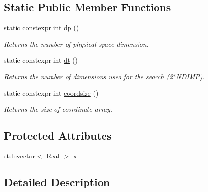 \subsection*{Static Public Member Functions}
\begin{DoxyCompactItemize}
\item 
\hypertarget{classBox_ac6c8af90475ae92c884f1ad4c569749f}{
static constexpr int \hyperlink{classBox_ac6c8af90475ae92c884f1ad4c569749f}{dp} ()}
\label{classBox_ac6c8af90475ae92c884f1ad4c569749f}

\begin{DoxyCompactList}\small\item\em Returns the number of physical space dimension. \item\end{DoxyCompactList}\item 
\hypertarget{classBox_a0c260b284827a9055b885930200e5460}{
static constexpr int \hyperlink{classBox_a0c260b284827a9055b885930200e5460}{dt} ()}
\label{classBox_a0c260b284827a9055b885930200e5460}

\begin{DoxyCompactList}\small\item\em Returns the number of dimensions used for the search (2$\ast$NDIMP). \item\end{DoxyCompactList}\item 
\hypertarget{classBox_ac249e82f2f46555e5f6e2a98d7f9541c}{
static constexpr int \hyperlink{classBox_ac249e82f2f46555e5f6e2a98d7f9541c}{coordsize} ()}
\label{classBox_ac249e82f2f46555e5f6e2a98d7f9541c}

\begin{DoxyCompactList}\small\item\em Returns the size of coordinate array. \item\end{DoxyCompactList}\end{DoxyCompactItemize}
\subsection*{Protected Attributes}
\begin{DoxyCompactItemize}
\item 
std::vector$<$ Real $>$ \hyperlink{classBox_a07648c6766718416a0a68dcd46258933}{x\_\-}
\end{DoxyCompactItemize}


\subsection{Detailed Description}
